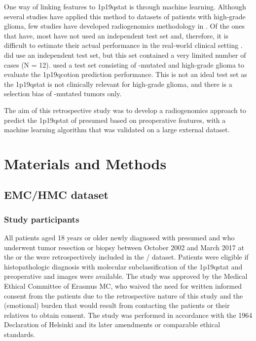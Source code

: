 One way of linking  features to \acl{1p19qstat} is through machine learning.
Although several studies have applied this method to datasets of patients with high-grade glioma, few studies have developed radiogenomics methodology in  \autocite{akkus2017predicting, li2017deep, chang2018deep, han2018non, lu2018machine, zhou2019machine}.
Of the ones that have, most have not used an independent test set and, therefore, it is difficult to estimate their actual performance in the real-world clinical setting \autocite{akkus2017predicting, li2017deep, chang2018deep, han2018non}.
 did use an independent test set, but this set contained a very limited number of  cases (N = 12).
 used a test set consisting of -mutated  and high-grade glioma to evaluate the \acl{1p19qcotion} prediction performance.
This is not an ideal test set as the \acl{1p19qstat} is not clinically relevant for high-grade glioma, and there is a selection bias of -mutated \glspl{tumor} only.

The aim of this retrospective study was to develop a radiogenomics approach to predict the \acl{1p19qstat} of presumed  based on preoperative  features, with a machine learning algorithm that was validated on a large external dataset.

\section{Materials and Methods}
\subsection{\acrshort{EMC}/\acrshort{HMC} dataset}
\subsubsection{Study participants}

All patients aged 18 years or older newly diagnosed with presumed  and who underwent \gls{tumor} resection or biopsy between October 2002 and March 2017 at the  or the  were retrospectively included in the / dataset.
Patients were eligible if histopathologic diagnosis with molecular subclassification of the \acl{1p19qstat} and preoperative  and   images were available.
The study was approved by the Medical Ethical Committee of Erasmus MC, who waived the need for written informed consent from the patients due to the retrospective nature of this study and the (emotional) burden that would result from contacting the patients or their relatives to obtain consent.
The study was performed in accordance with the 1964 Declaration of Helsinki and its later amendments or comparable ethical standards.

